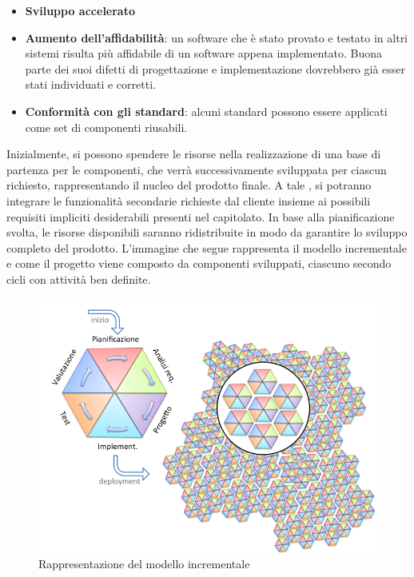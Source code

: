 \begin{itemize}
\begin{itemize}
			\item \textbf{Sviluppo accelerato}
			\item \textbf{Aumento dell'affidabilità}: un software che è stato provato e testato in altri sistemi risulta più affidabile di un software appena implementato.
			Buona parte dei suoi difetti di progettazione e implementazione dovrebbero già esser stati individuati e corretti.
			\item \textbf{Conformità con gli standard}: alcuni standard
			possono essere applicati come set di componenti riusabili.
		\end{itemize}
	\end{itemize}
	Inizialmente, si possono spendere le risorse nella realizzazione di una base di partenza per le componenti, che verrà successivamente sviluppata per ciascun  richiesto, rappresentando il nucleo del prodotto finale.
	A tale , si potranno integrare le funzionalità secondarie richieste dal cliente insieme ai possibili requisiti impliciti desiderabili presenti nel capitolato. In base alla pianificazione svolta, le risorse disponibili saranno ridistribuite in modo da garantire lo sviluppo completo del prodotto.
	L'immagine che segue rappresenta il modello incrementale e come il progetto viene composto da componenti sviluppati, ciascuno secondo cicli con attività ben definite.
	\begin{figure}[H]
		\centering
		\includegraphics[scale=0.5]{img/modello_incrementale.png}
		\caption{Rappresentazione del modello incrementale\protect\footnotemark}
		\label{fig:modello_incrementale}
	\end{figure}

	

